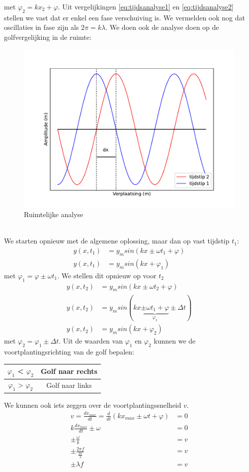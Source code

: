 \documentclass[a4paper,kul]{kulakarticle} %
\begin{document}
met $\varphi_2 = kx_2 +\varphi$. Uit vergelijkingen \ref{eq:tijdsanalyse1} en \ref{eq:tijdsanalyse2} stellen we vast dat er enkel een fase verschuiving is. We vermelden ook nog dat oscillaties in fase zijn als $2\pi = k\lambda$.
\newpage
We doen ook de analyse doen op de golfvergelijking in de ruimte:\\
\begin{figure}[h]
	\centering
	\includegraphics[width=0.7\linewidth]{ruimtelijke_analyse}
	\caption[Ruimtelijke analyse]{Ruimtelijke analyse}
	\label{fig:ruimtelijkeanalyse}
\end{figure}\\
We starten opnieuw met de algemene oplossing, maar dan op vast tijdstip $t_1$:
\begin{align}
	y(x,t_1) &= y_msin(kx \pm \omega t_1 +\varphi)\\
	\label{eq:ruimteanalyse1}
	y(x,t_1) &= y_msin(kx +\varphi_1)
\end{align}
met $\varphi_1 = \varphi \pm \omega t_1$. We stellen dit opnieuw op voor $t_2$
\begin{align}
	y(x,t_2) &= y_msin(kx \pm \omega t_2 +\varphi)\\
	y(x,t_2) &= y_msin(kx \underbrace{\pm \omega t_1 +\varphi}_{\varphi_1}\pm\Delta t)\\
	\label{eq:ruimteanalyse2}
	y(x,t_2) &= y_msin(kx +\varphi_2)
\end{align}
met $\varphi_2 = \varphi_1\pm\Delta t$.
Uit de waarden van $\varphi_1$ en $\varphi_2$ kunnen we de voortplantingsrichting van de golf bepalen: 
\begin{center}
	\begin{tabular}{|c|c|}
		\hline
		$\varphi_1$ < $\varphi_2$& Golf naar rechts \\
		\hline
		$\varphi_1$ > $\varphi_2$& Golf naar links \\
		\hline
	\end{tabular} 
\end{center}
We kunnen ook iets zeggen over de voortplantingssnelheid $v$.
\begin{align*}
 v = \frac{dx_{max}}{dt} = \frac{d}{dt}(kx_{max} \pm \omega t +\varphi) &= 0\\
 k\frac{dx_{max}}{dt}\pm \omega & = 0\\
 \pm \frac{\omega}{k} & = v\\
 \pm\frac{2\pi f}{\frac{2\pi}{\lambda}} & = v\\
 \pm \lambda f & = v
\end{align*}
\newpage
\end{document}
